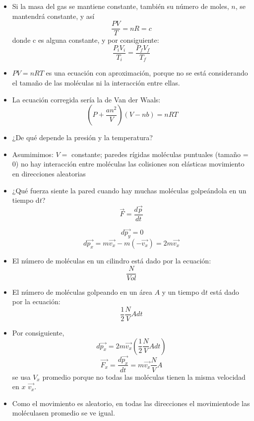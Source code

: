\documentclass[12pt]{article}
\begin{document}
\begin{itemize}
\item Si la masa del gas se mantiene constante, también su número de moles, $n$, se mantendrá constante, y así 
\begin{equation}
\dfrac{PV}{T} = nR = c
\end{equation}
donde c es alguna constante, y por consiguiente: 
\begin{equation}
\dfrac{P_iV_i}{T_i} = \dfrac{P_fV_f}{T_f}
\end{equation}
\item $PV = nRT$ es una ecuación con aproximación, porque no se está considerando el tamaño de las moléculas ni la interacción entre ellas. 
\item La ecuación corregida sería la de Van der Waals:
\begin{equation}
\ (P+\dfrac{an^2}{V})(V-nb) = nRT
\end{equation}
\item ¿De qué depende la presión y la temperatura? 
\item Asumimimos:
\subitem $V = $ constante; paredes rígidas
\subitem moléculas puntuales (tamaño = 0)
\subitem no hay interacción entre moléculas
\subitem las colisiones son elásticas
\subitem movimiento en direcciones aleatorias
\item ¿Qué fuerza siente la pared cuando hay muchas moléculas golpeándola en un tiempo d$t$?
\begin{equation}
\vec{F} = \dfrac{d\vec{p}}{dt}
\end{equation}
\begin{footnotesize}
\begin{equation}
\ d\vec{p_y}= 0  
\end{equation}
\begin{equation}
 d\vec{p_x}= m\vec{v_x}-m(-\vec{v_x})= 2m\vec{v_x}
\end{equation}
\end{footnotesize}
\item El número de moléculas en un cilindro está dado por la ecuación:
\begin{equation}
\dfrac{N}{Vol}
\end{equation}
\item El número de moléculas golpeando en un área $A$ y un tiempo d$t$ está dado por la ecuación:
\begin{equation}
\dfrac{1}{2}\dfrac{N}{V}Adt
\end{equation}
\item Por consiguiente,
\begin{equation}
d\vec{p_x} = 2m\vec{v_x}(\dfrac{1}{2}\dfrac{N}{V}Adt)
\end{equation}
\begin{equation}
\vec{F_x} = \dfrac{d\vec{p_x}}{dt} = m\vec{v_x}\dfrac{N}{V}A
\end{equation}
se usa $V_x$ promedio porque no todas las moléculas tienen la misma velocidad en $x$ $\vec{v_x}$.
\item Como el movimiento es aleatorio, en todas las direcciones el movimientode las moléculasen promedio se ve igual.
\end{itemize}
\end{document}
